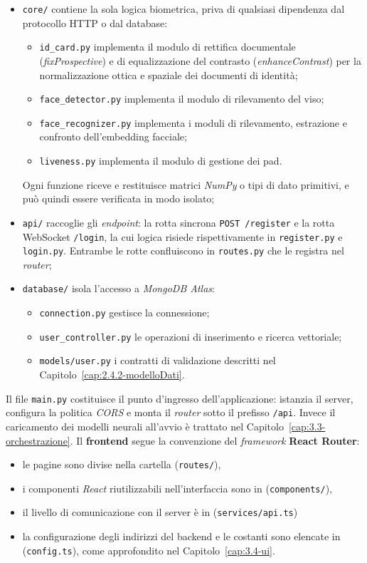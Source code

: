 \begin{itemize}
    \item \texttt{core/} contiene la sola logica biometrica, priva di qualsiasi dipendenza dal protocollo HTTP o dal database:
    \begin{itemize}
        \item \texttt{id\_card.py} implementa il modulo di rettifica documentale (\textit{fixProspective}) e di equalizzazione del contrasto (\textit{enhanceContrast}) per la normalizzazione ottica e spaziale dei documenti di identità;
        \item \texttt{face\_detector.py} implementa il modulo di rilevamento del viso;
        \item \texttt{face\_recognizer.py} implementa i moduli di rilevamento, estrazione e confronto dell'embedding facciale;
        \item \texttt{liveness.py} implementa il modulo di gestione dei \gls{pad}.
    \end{itemize}
    Ogni funzione riceve e restituisce matrici \textit{NumPy} o tipi di dato primitivi, e può quindi essere verificata in modo isolato;
    \item \texttt{api/} raccoglie gli \textit{endpoint}: la rotta sincrona \texttt{POST /register} e la rotta WebSocket \texttt{/login}, la cui logica risiede rispettivamente in \texttt{register.py} e \texttt{login.py}. Entrambe le rotte confluiscono in \texttt{routes.py} che le registra nel \textit{router};
    \item \texttt{database/} isola l'accesso a \textit{MongoDB Atlas}: 
    \begin{itemize}
    \item\texttt{connection.py} gestisce la connessione;
    \item \texttt{user\_controller.py} le operazioni di inserimento e ricerca vettoriale;
    \item \texttt{models/user.py} i contratti di validazione descritti nel Capitolo~\ref{cap:2.4.2-modelloDati}.
    \end{itemize}
\end{itemize}
Il file \texttt{main.py} costituisce il punto d'ingresso dell'applicazione: istanzia il server, configura la politica \textit{CORS} e monta il \textit{router} sotto il prefisso \texttt{/api}. 
Invece il caricamento dei modelli neurali all'avvio è trattato nel Capitolo~\ref{cap:3.3-orchestrazione}.\quad
Il \textbf{frontend} segue la convenzione del \textit{framework} \textbf{React Router}:
\begin{itemize}
    \item le pagine sono divise nella cartella (\texttt{routes/}), 
    \item i componenti \textit{React} riutilizzabili nell'interfaccia sono in (\texttt{components/}), 
    \item il livello di comunicazione con il server è in (\texttt{services/api.ts}) 
    \item la configurazione degli indirizzi del backend e le costanti sono elencate in (\texttt{config.ts}), come approfondito nel Capitolo~\ref{cap:3.4-ui}.
\end{itemize}
